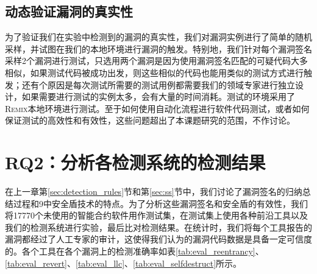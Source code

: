 \subsection{动态验证漏洞的真实性}

为了验证我们在实验中检测到的漏洞的真实性，我们对漏洞实例进行了简单的随机采样，并试图在我们的本地环境进行漏洞的触发。特别地，我们针对每个漏洞签名采样2个漏洞进行测试，只选用两个漏洞是因为使用漏洞签名匹配的可疑代码大多相似，如果测试代码被成功出发，则这些相似的代码也能用类似的测试方式进行触发；还有个原因是每次测试所需要的测试用例都需要我们的领域专家进行独立设计，如果需要进行测试的实例太多，会有大量的时间消耗。测试的环境采用了\textsc{Remix}本地环境进行测试。至于如何使用自动化流程进行软件代码测试，或者如何保证测试的高效性和有效性，这些问题超出了本课题研究的范围，不作讨论。

\section{RQ2：分析各检测系统的检测结果}

在上一章第\ref{sec:detection_rules}节和第\ref{sec:ss}节中，我们讨论了漏洞签名的归纳总结过程和9中安全盾技术的特点。为了分析这些漏洞签名和安全盾的有效性，我们将17770个未使用的智能合约软件用作测试集，在测试集上使用各种前沿工具以及我们的检测系统进行实验，最后比对检测结果。在统计时，我们将每个工具报告的漏洞都经过了人工专家的审计，这使得我们认为的漏洞代码数据是具备一定可信度的。各个工具在各个漏洞上的检测准确率如表\ref{tab:eval_reentrancy}、\ref{tab:eval_revert}、\ref{tab:eval_llc}、\ref{tab:eval_selfdestruct}所示。

